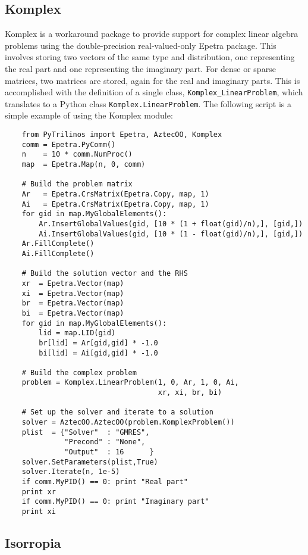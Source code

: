 \documentclass[11pt]{article}
\begin{document}
\subsection{Komplex}
\label{sec:komplex}

Komplex is a workaround package to provide support for complex linear algebra problems using the double-precision real-valued-only Epetra package.  This involves storing two vectors of the same type and distribution, one representing the real part and one representing the imaginary part.  For dense or sparse matrices, two matrices are stored, again for the real and imaginary parts.  This is accomplished with the definition of a single class, {\tt Komplex\_LinearProblem}, which translates to a Python class {\tt Komplex.LinearProblem}.  The following script is a simple example of using the Komplex module:

\begin{verbatim}
    from PyTrilinos import Epetra, AztecOO, Komplex
    comm = Epetra.PyComm()
    n    = 10 * comm.NumProc()
    map  = Epetra.Map(n, 0, comm)
    
    # Build the problem matrix
    Ar   = Epetra.CrsMatrix(Epetra.Copy, map, 1)
    Ai   = Epetra.CrsMatrix(Epetra.Copy, map, 1)
    for gid in map.MyGlobalElements():
        Ar.InsertGlobalValues(gid, [10 * (1 + float(gid)/n),], [gid,])
        Ai.InsertGlobalValues(gid, [10 * (1 - float(gid)/n),], [gid,])
    Ar.FillComplete()
    Ai.FillComplete()

    # Build the solution vector and the RHS
    xr  = Epetra.Vector(map)
    xi  = Epetra.Vector(map)
    br  = Epetra.Vector(map)
    bi  = Epetra.Vector(map)
    for gid in map.MyGlobalElements():
        lid = map.LID(gid)
        br[lid] = Ar[gid,gid] * -1.0
        bi[lid] = Ai[gid,gid] * -1.0

    # Build the complex problem
    problem = Komplex.LinearProblem(1, 0, Ar, 1, 0, Ai,
                                    xr, xi, br, bi)

    # Set up the solver and iterate to a solution
    solver = AztecOO.AztecOO(problem.KomplexProblem())
    plist  = {"Solver"  : "GMRES",
              "Precond" : "None",
              "Output"  : 16      }
    solver.SetParameters(plist,True)
    solver.Iterate(n, 1e-5)
    if comm.MyPID() == 0: print "Real part"
    print xr
    if comm.MyPID() == 0: print "Imaginary part"
    print xi
\end{verbatim}

\subsection{Isorropia}
\label{sec:isorropia}
\end{document}
